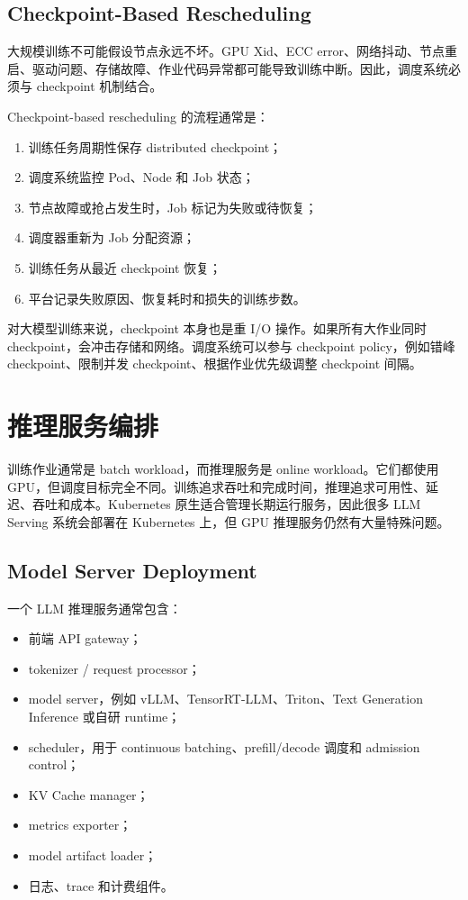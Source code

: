 \subsection{Checkpoint-Based Rescheduling}
\label{subsec:checkpoint-based-rescheduling}

大规模训练不可能假设节点永远不坏。GPU Xid、ECC error、网络抖动、节点重启、驱动问题、存储故障、作业代码异常都可能导致训练中断。因此，调度系统必须与 checkpoint 机制结合。

Checkpoint-based rescheduling 的流程通常是：

\begin{enumerate}
  \item 训练任务周期性保存 distributed checkpoint；
  \item 调度系统监控 Pod、Node 和 Job 状态；
  \item 节点故障或抢占发生时，Job 标记为失败或待恢复；
  \item 调度器重新为 Job 分配资源；
  \item 训练任务从最近 checkpoint 恢复；
  \item 平台记录失败原因、恢复耗时和损失的训练步数。
\end{enumerate}

对大模型训练来说，checkpoint 本身也是重 I/O 操作。如果所有大作业同时 checkpoint，会冲击存储和网络。调度系统可以参与 checkpoint policy，例如错峰 checkpoint、限制并发 checkpoint、根据作业优先级调整 checkpoint 间隔。

\section{推理服务编排}
\label{sec:serving-orchestration}

训练作业通常是 batch workload，而推理服务是 online workload。它们都使用 GPU，但调度目标完全不同。训练追求吞吐和完成时间，推理追求可用性、延迟、吞吐和成本。Kubernetes 原生适合管理长期运行服务，因此很多 LLM Serving 系统会部署在 Kubernetes 上，但 GPU 推理服务仍然有大量特殊问题。

\subsection{Model Server Deployment}
\label{subsec:model-server-deployment}

一个 LLM 推理服务通常包含：

\begin{itemize}
  \item 前端 API gateway；
  \item tokenizer / request processor；
  \item model server，例如 vLLM、TensorRT-LLM、Triton、Text Generation Inference 或自研 runtime；
  \item scheduler，用于 continuous batching、prefill/decode 调度和 admission control；
  \item KV Cache manager；
  \item metrics exporter；
  \item model artifact loader；
  \item 日志、trace 和计费组件。
\end{itemize}

